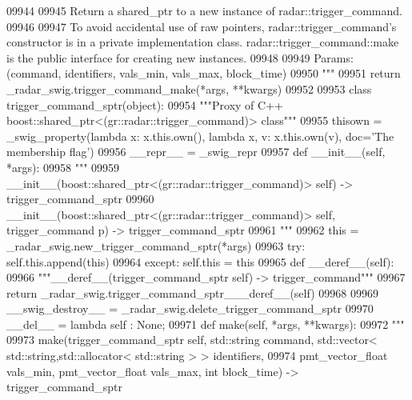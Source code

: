 \begin{DoxyCode}
{{{{{{{{{{{{{{{{{{{{{{{{{{{{{{{{09944 \textcolor{stringliteral}{}
09945 \textcolor{stringliteral}{    Return a shared\_ptr to a new instance of radar::trigger\_command.}
09946 \textcolor{stringliteral}{}
09947 \textcolor{stringliteral}{    To avoid accidental use of raw pointers, radar::trigger\_command's constructor is in a private
       implementation class. radar::trigger\_command::make is the public interface for creating new instances.}
09948 \textcolor{stringliteral}{}
09949 \textcolor{stringliteral}{    Params: (command, identifiers, vals\_min, vals\_max, block\_time)}
09950 \textcolor{stringliteral}{    """}
09951   \textcolor{keywordflow}{return} \_radar\_swig.trigger\_command\_make(*args, **kwargs)
09952 
09953 \textcolor{keyword}{class }trigger_command_sptr(object):
09954     \textcolor{stringliteral}{"""Proxy of C++ boost::shared\_ptr<(gr::radar::trigger\_command)> class"""}
09955     thisown = _swig_property(\textcolor{keyword}{lambda} x: x.this.own(), \textcolor{keyword}{lambda} x, v: x.this.own(v), doc=\textcolor{stringliteral}{'The membership flag'})
09956     \_\_repr\_\_ = \_swig\_repr
09957     \textcolor{keyword}{def }__init__(self, *args): 
09958         \textcolor{stringliteral}{"""}
09959 \textcolor{stringliteral}{        \_\_init\_\_(boost::shared\_ptr<(gr::radar::trigger\_command)> self) -> trigger\_command\_sptr}
09960 \textcolor{stringliteral}{        \_\_init\_\_(boost::shared\_ptr<(gr::radar::trigger\_command)> self, trigger\_command p) ->
       trigger\_command\_sptr}
09961 \textcolor{stringliteral}{        """}
09962         this = \_radar\_swig.new\_trigger\_command\_sptr(*args)
09963         \textcolor{keywordflow}{try}: self.this.append(this)
09964         \textcolor{keywordflow}{except}: self.this = this
09965     \textcolor{keyword}{def }__deref__(self):
09966         \textcolor{stringliteral}{"""\_\_deref\_\_(trigger\_command\_sptr self) -> trigger\_command"""}
09967         \textcolor{keywordflow}{return} \_radar\_swig.trigger\_command\_sptr\_\_\_deref\_\_(self)
09968 
09969     \_\_swig\_destroy\_\_ = \_radar\_swig.delete\_trigger\_command\_sptr
09970     \_\_del\_\_ = \textcolor{keyword}{lambda} self : \textcolor{keywordtype}{None};
09971     \textcolor{keyword}{def }make(self, *args, **kwargs):
09972         \textcolor{stringliteral}{"""}
09973 \textcolor{stringliteral}{        make(trigger\_command\_sptr self, std::string command, std::vector< std::string,std::allocator<
       std::string > > identifiers, }
09974 \textcolor{stringliteral}{            pmt\_vector\_float vals\_min, pmt\_vector\_float vals\_max, int block\_time) -> trigger\_command\_sptr}
}}}}}}}}}}}}}}}}}}}}}}}}}}}}}}}}
\end{DoxyCode}
